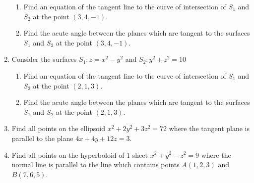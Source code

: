\documentclass[12pt]{article}
\begin{document}
\begin{enumerate}
\begin{enumerate}
\item Find an equation of the tangent line to the curve of intersection of $S_1$ and $S_2$ at the point $(3,4,-1)$.


\item Find the acute angle between the planes which are tangent to the surfaces $S_1$ and $S_2$ at the point $(3,4,-1)$.


\end{enumerate}

\item Consider the surfaces $S_1: z=x^2-y^2$ and $S_2: y^2+z^2=10$

\begin{enumerate}

\item Find an equation of the tangent line to the curve of intersection of $S_1$ and $S_2$ at the point $(2,1,3)$.


\item Find the acute angle between the planes which are tangent to the surfaces $S_1$ and $S_2$ at the point $(2,1,3)$.


\end{enumerate}

\item Find all points on the ellipsoid $x^2+2y^2+3z^2=72$ where the tangent plane is parallel to the plane $4x+4y+12z=3$.


\item Find all points on the hyperboloid of 1 sheet $x^2+y^2-z^2=9$ where the normal line is parallel to the line which contains points $A(1,2,3)$ and $B(7,6,5)$.



\end{enumerate}
\end{document}
